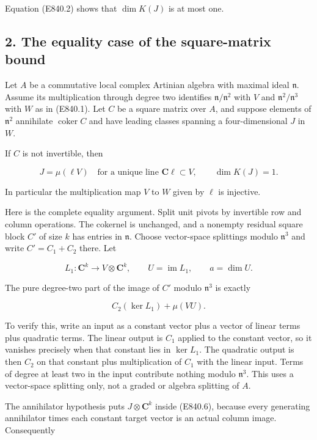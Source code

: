 Equation (E840.2) shows that \(\dim K(J)\) is at most one.

\subsection{2. The equality case of the square-matrix
bound}\label{the-equality-case-of-the-square-matrix-bound}

Let \(A\) be a commutative local complex Artinian algebra with maximal
ideal \(\mathfrak n\). Assume its multiplication through degree two
identifies \(\mathfrak n/\mathfrak n^2\) with \(V\) and
\(\mathfrak n^2/\mathfrak n^3\) with \(W\) as in (E840.1). Let \(C\) be
a square matrix over \(A\), and suppose elements of \(\mathfrak n^2\)
annihilate \(\operatorname{coker}C\) and have leading classes spanning a
four-dimensional \(J\) in \(W\).

If \(C\) is not invertible, then

\[
                   J=\mu(\ell V)
       \quad\text{for a unique line }\mathbf C\ell\subset V,
       \qquad \dim K(J)=1.
 \tag{E840.4}
\]

In particular the multiplication map \(V\) to \(W\) given by \(\ell\) is
injective.

Here is the complete equality argument. Split unit pivots by invertible
row and column operations. The cokernel is unchanged, and a nonempty
residual square block \(C'\) of size \(k\) has entries in
\(\mathfrak n\). Choose vector-space splittings modulo \(\mathfrak n^3\)
and write \(C'=C_1+C_2\) there. Let

\[
 L_1:\mathbf C^k\longrightarrow V\otimes\mathbf C^k,
 \qquad U=\operatorname{im}L_1,\qquad a=\dim U.
 \tag{E840.5}
\]

The pure degree-two part of the image of \(C'\) modulo \(\mathfrak n^3\)
is exactly

\[
             C_2(\ker L_1)+\mu(VU).
 \tag{E840.6}
\]

To verify this, write an input as a constant vector plus a vector of
linear terms plus quadratic terms. The linear output is \(C_1\) applied
to the constant vector, so it vanishes precisely when that constant lies
in \(\ker L_1\). The quadratic output is then \(C_2\) on that constant
plus multiplication of \(C_1\) with the linear input. Terms of degree at
least two in the input contribute nothing modulo \(\mathfrak n^3\). This
uses a vector-space splitting only, not a graded or algebra splitting of
\(A\).

The annihilator hypothesis puts \(J\otimes\mathbf C^k\) inside (E840.6),
because every generating annihilator times each constant target vector
is an actual column image. Consequently

